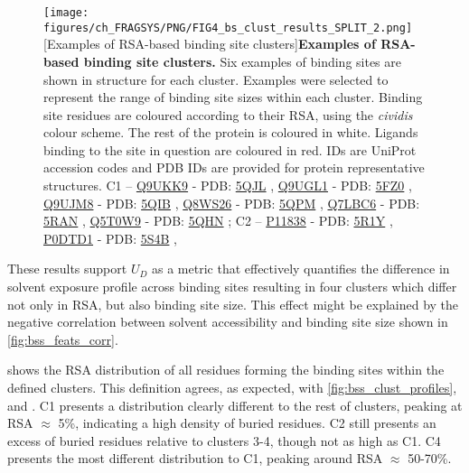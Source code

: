 \begin{figure}[ht!]
    \centering
    \texttt{[image: figures/ch\_FRAGSYS/PNG/FIG4\_bs\_clust\_results\_SPLIT\_2.png]}
    [Examples of RSA-based binding site clusters]{\textbf{Examples of RSA-based binding site clusters.} Six examples of binding sites are shown in structure for each cluster. Examples were selected to represent the range of binding site sizes within each cluster. Binding site residues are coloured according to their RSA, using the \textit{cividis} colour scheme. The rest of the protein is coloured in white. Ligands binding to the site in question are coloured in red.  IDs are UniProt accession codes and PDB IDs are provided for protein representative structures. C1 -- \href{https://www.uniprot.org/uniprotkb/Q9UKK9/entry}{Q9UKK9} - PDB: \href{https://www.ebi.ac.uk/pdbe/entry/pdb/5qjl}{5QJL} \cite{PDB_5QJL}, \href{https://www.uniprot.org/uniprotkb/Q9UGL1/entry}{Q9UGL1} - PDB: \href{https://www.ebi.ac.uk/pdbe/entry/pdb/5fz0}{5FZ0} \cite{PDB_5FZ0}, \href{https://www.uniprot.org/uniprotkb/Q9UJM8/entry}{Q9UJM8} - PDB: \href{https://www.ebi.ac.uk/pdbe/entry/pdb/5qib}{5QIB} \cite{PDB_5QIB}, \href{https://www.uniprot.org/uniprotkb/Q8WS26/entry}{Q8WS26} - PDB: \href{https://www.ebi.ac.uk/pdbe/entry/pdb/5qpm}{5QPM} \cite{PDB_5QPM}, \href{https://www.uniprot.org/uniprotkb/Q7LBC6/entry}{Q7LBC6} - PDB: \href{https://www.ebi.ac.uk/pdbe/entry/pdb/5ran}{5RAN} \cite{PDB_5RAN}, \href{https://www.uniprot.org/uniprotkb/Q5T0W9/entry}{Q5T0W9} - PDB: \href{https://www.ebi.ac.uk/pdbe/entry/pdb/5qhn}{5QHN} \cite{PDB_5QHN}; C2 -- \href{https://www.uniprot.org/uniprotkb/P11838/entry}{P11838} - PDB: \href{https://www.ebi.ac.uk/pdbe/entry/pdb/5r1y}{5R1Y} \cite{WOLLENHAUPT_2020_F2X}, \href{https://www.uniprot.org/uniprotkb/P0DTD1/entry}{P0DTD1} - PDB: \href{https://www.ebi.ac.uk/pdbe/entry/pdb/5s4b}{5S4B} \cite{SCHULLER_2021_NSP3},}
\label{fig:bss_clusts_examples}
\end{figure}

These results support $U_{D}$ as a metric that effectively quantifies the difference in solvent exposure profile across binding sites resulting in four clusters which differ not only in RSA, but also binding site size. This effect might be explained by the negative correlation between solvent accessibility and binding site size shown in \autoref{fig:bss_feats_corr}.

 shows the RSA distribution of all residues forming the binding sites within the defined clusters. This definition agrees, as expected, with \autoref{fig:bss_clust_profiles}, and  . C1 presents a distribution clearly different to the rest of clusters, peaking at RSA $\approx$ 5\%, indicating a high density of buried residues. C2 still presents an excess of buried residues relative to clusters 3-4, though not as high as C1. C4 presents the most different distribution to C1, peaking around RSA $\approx$ 50-70\%.

